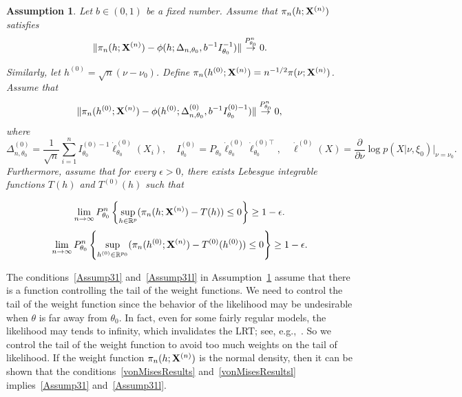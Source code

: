 \documentclass[11pt]{article}
\theoremstyle{plain}
\newtheorem{assumption}{\quad\quad Assumption}
\theoremstyle{definition}
\theoremstyle{remark}
\begin{document}
\begin{assumption}\label{Assumption3}
    Let $b\in(0,1)$ be a fixed number.
    Assume that $\pi_n(h;\mathbf{X}^{(n)})$ satisfies
        \begin{equation}\label{vonMisesResults}
            \|\pi_n(h;\mathbf{X}^{(n)})-\phi(h;\Delta_{n,\theta_0},b^{-1}I_{\theta_0}^{-1})\|\overset{P_{\theta_0}^n}{\to}0.
        \end{equation}

        Similarly, let $h^{(0)}=\sqrt{n}(\nu-\nu_0)$. Define $\pi_n(h^{(0)};\mathbf{X}^{(n)})=n^{-1/2}\pi(\nu;\mathbf{X}^{(n)})$. Assume that 
\begin{equation}\label{vonMisesResultsl}
    \|\pi_n(h^{(0)};\mathbf{X}^{(n)})-\phi(h^{(0)};\Delta^{(0)}_{n,\theta_0},b^{-1}I_{\theta_0}^{(0)-1})\|\overset{P_{\theta_0}^n}{\to}0,
\end{equation}
where $$ \Delta_{n,\theta_0}^{(0)}
=\frac{1}{\sqrt{n}}\sum_{i=1}^n I_{\theta_0}^{(0)-1}\dot{\ell}^{(0)}_{\theta_0}(X_i),
\quad I^{(0)}_{\theta_0}=P_{\theta_0}\dot{\ell}_{\theta_0}^{(0)}\dot{\ell}_{\theta_0}^{(0)\top},\quad 
\dot{\ell}^{(0)}(X)=\frac{\partial}{\partial \nu}\log p(X|\nu,\xi_0)\Big|_{\nu=\nu_0}
.
$$
Furthermore, assume that for every $\epsilon>0$, there exists Lebesgue integrable functions $T(h)$ and $T^{(0)}(h)$ such that 

    \begin{equation}\label{Assump31}
        \lim_{n\to \infty}P_{\theta_0}^n\left\{\sup_{h\in \mathbb{R}^p}(\pi_n(h;\mathbf{X}^{(n)})-T(h))\leq 0\right\}\geq 1-\epsilon.
\end{equation}
    \begin{equation}\label{Assump31l}
        \lim_{n\to \infty}P_{\theta_0}^n\left\{\sup_{h^{(0)}\in \mathbb{R}^{p_0}}(\pi_n(h^{(0)};\mathbf{X}^{(n)})-T^{(0)}(h^{(0)}))\leq 0\right\}\geq 1-\epsilon.
\end{equation}


\end{assumption}
The conditions~\eqref{Assump31} and~\eqref{Assump31l} in Assumption~\ref{Assumption3} assume that there is a function controlling the tail of the weight functions.
We need to control the tail of the weight function since the behavior of the likelihood may be undesirable when $\theta$ is far away from $\theta_0$.
In fact, even for some fairly regular models, the likelihood may tends to infinity, which invalidates the LRT; see, e.g.,~\cite{Cam1990Maximum}.
So we control the tail of the weight function to avoid too much weights on the tail of likelihood.
If the weight function $\pi_n(h;\mathbf{X}^{(n)})$ is the normal density, then it can be shown that the conditions~\eqref{vonMisesResults} and~\eqref{vonMisesResultsl} implies~\eqref{Assump31} and~\eqref{Assump31l}.
\end{document}
